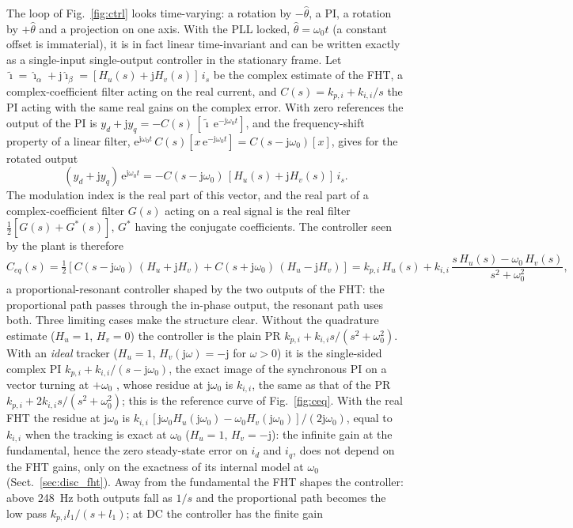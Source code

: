 \documentclass[10pt,a4paper]{scrartcl}
\newcommand{\wo}{\omega_0}
\newcommand{\kpi}{k_{p,i}}
\newcommand{\kii}{k_{i,i}}
\newcommand{\jj}{\mathrm{j}}
\newcommand{\ee}{\mathrm{e}}
\newcommand{\ihat}{\hat{\imath}}
\newcommand{\Ceq}{C_{eq}}
\newcommand{\Hu}{H_u}
\newcommand{\Hv}{H_v}
\begin{document}
\begin{onehalfspace}
The loop of Fig.~\ref{fig:ctrl} looks time-varying: a rotation by $-\hat\theta$, a PI, a rotation by $+\hat\theta$ and a projection on one axis. With the PLL locked, $\hat\theta = \wo t$ (a constant offset is immaterial), it is in fact linear time-invariant and can be written exactly as a single-input single-output controller in the stationary frame. Let $\tilde\imath = \ihat_\alpha + \jj\ihat_\beta = [\Hu(s) + \jj\Hv(s)]\,i_s$ be the complex estimate of the FHT, a complex-coefficient filter acting on the real current, and $C(s) = \kpi + \kii/s$ the PI acting with the same real gains on the complex error. With zero references the output of the PI is $y_d + \jj y_q = -C(s)\,[\tilde\imath\,\ee^{-\jj\wo t}]$, and the frequency-shift property of a linear filter, $\ee^{\jj\wo t}\,C(s)[x\,\ee^{-\jj\wo t}] = C(s - \jj\wo)[x]$, gives for the rotated output
\begin{equation}
(y_d + \jj y_q)\,\ee^{\jj\wo t} = -C(s - \jj\wo)\,[\Hu(s) + \jj\Hv(s)]\,i_s .
\label{eq:shift}
\end{equation}
The modulation index is the real part of this vector, and the real part of a complex-coefficient filter $G(s)$ acting on a real signal is the real filter $\tfrac12[G(s) + G^*(s)]$, $G^*$ having the conjugate coefficients. The controller seen by the plant is therefore
\begin{equation}
\Ceq(s) = \tfrac12\left[C(s - \jj\wo)\,(\Hu + \jj\Hv) + C(s + \jj\wo)\,(\Hu - \jj\Hv)\right]
= \kpi\,\Hu(s) + \kii\,\frac{s\,\Hu(s) - \wo\,\Hv(s)}{s^2 + \wo^2},
\label{eq:ceq}
\end{equation}
a proportional-resonant controller \cite{zmood2003, teodorescu2006} shaped by the two outputs of the FHT: the proportional path passes through the in-phase output, the resonant path uses both. Three limiting cases make the structure clear. Without the quadrature estimate ($\Hu = 1$, $\Hv = 0$) the controller is the plain PR $\kpi + \kii s/(s^2 + \wo^2)$. With an \emph{ideal} tracker ($\Hu = 1$, $\Hv(\jj\omega) = -\jj$ for $\omega > 0$) it is the single-sided complex PI $\kpi + \kii/(s - \jj\wo)$, the exact image of the synchronous PI on a vector turning at $+\wo$ \cite{zmood2001}, whose residue at $\jj\wo$ is $\kii$, the same as that of the PR $\kpi + 2\kii s/(s^2 + \wo^2)$; this is the reference curve of Fig.~\ref{fig:ceq}. With the real FHT the residue at $\jj\wo$ is $\kii\,[\jj\wo\Hu(\jj\wo) - \wo\Hv(\jj\wo)]/(2\jj\wo)$, equal to $\kii$ when the tracking is exact at $\wo$ ($\Hu = 1$, $\Hv = -\jj$): the infinite gain at the fundamental, hence the zero steady-state error on $i_d$ and $i_q$, does not depend on the FHT gains, only on the exactness of its internal model at $\wo$ (Sect.~\ref{sec:disc_fht}). Away from the fundamental the FHT shapes the controller: above \SI{248}{Hz} both outputs fall as $1/s$ and the proportional path becomes the low pass $\kpi l_1/(s + l_1)$; at DC the controller has the finite gain

\end{onehalfspace}
\end{document}
